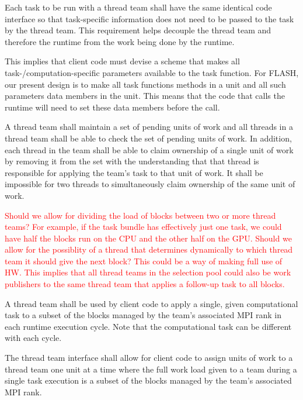 \documentclass{article}
\begin{document}
\begin{req}
Each task to be run with a thread team shall have the same identical code
interface so that task-specific information does not need to be passed to the
task by the thread team.  This requirement helps decouple the thread team and
therefore the runtime from the work being done by the runtime.
\end{req}

This implies that client code must devise a scheme that makes all
task-/computation-specific parameters available to the task function.  For
FLASH, our present design is to make all task functions methods in a unit and
all such parameters data members in the unit.  This means that the code that
calls the runtime will need to set these data members before the call.

\begin{req}
A thread team shall maintain a set of pending units of work and all threads in a
thread team shall be able to check the set of pending units of work.  In
addition, each thread in the team shall be able to claim ownership of a single
unit of work by removing it from the set with the understanding that that thread
is responsible for applying the team's task to that unit of work.  It shall be
impossible for two threads to simultaneously claim ownership of the same unit of
work.
\end{req}

\textcolor{red}{Should we allow for dividing the
load of blocks between two or more thread teams?  For example, if the task
bundle has effectively just one task, we could have half the blocks run on the
CPU and the other half on the GPU.  Should we allow for the possiblity of a
thread that determines dynamically to which thread team it should give the next
block?  This could be a way of making full use of HW.  This implies that all
thread teams in the selection pool could also be work publishers to the same
thread team that applies a follow-up task to all blocks.}

\begin{req}
A thread team shall be used by client code to apply a single, given
computational task to a subset of the blocks managed by the team's associated
MPI rank in each runtime execution cycle.  Note that the computational task can
be different with each cycle.
\end{req}

\begin{req}
The thread team interface shall allow for client code to assign units of
work to a thread team one unit at a time where the full work load given to a
team during a single task execution is a subset of the blocks managed by the
team's associated MPI rank.
\end{req}
\end{document}
